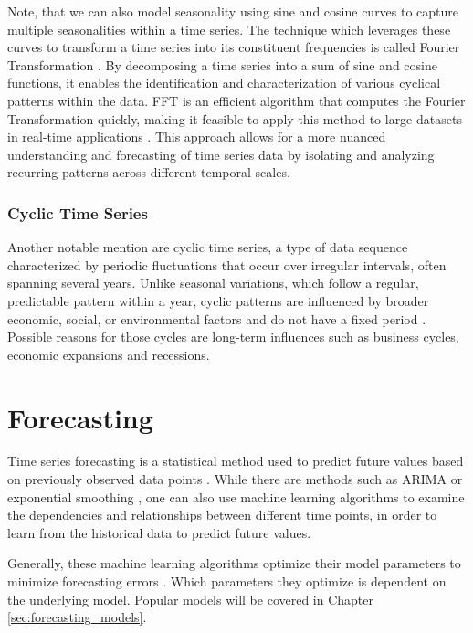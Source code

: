 Note, that we can also model seasonality using sine and cosine curves to capture multiple seasonalities within a time series. The technique which leverages these curves to transform a time series into its constituent frequencies is called Fourier Transformation \parencite[ch. 1]{bloomfield2004fourier}. By decomposing a time series into a sum of sine and cosine functions, it enables the identification and characterization of various cyclical patterns within the data. \ac{FFT} is an efficient algorithm that computes the Fourier Transformation quickly, making it feasible to apply this method to large datasets in real-time applications \parencite[ch. 5]{bloomfield2004fourier}. This approach allows for a more nuanced understanding and forecasting of time series data by isolating and analyzing recurring patterns across different temporal scales.

\subsubsection*{Cyclic Time Series}
Another notable mention are cyclic time series, a type of data sequence characterized by periodic fluctuations that occur over irregular intervals, often spanning several years. Unlike seasonal variations, which follow a regular, predictable pattern within a year, cyclic patterns are influenced by broader economic, social, or environmental factors and do not have a fixed period \parencite[p.4102]{gharehbaghi2017deep}. Possible reasons for those cycles are long-term influences such as business cycles, economic expansions and recessions.

\section{Forecasting}
\label{sec:Forecasting}
Time series forecasting is a statistical method used to predict future values based on previously observed data points \parencite[ch. 5]{box2015time}. While there are methods such as \ac{ARIMA} or exponential smoothing \parencite[ch. 5]{box2015time}, one can also use machine learning algorithms to examine the dependencies and relationships between different time points, in order to learn from the historical data to predict future values. 

Generally, these machine learning algorithms optimize their model parameters to minimize forecasting errors \parencite[ch. 5]{box2015time}. Which parameters they optimize is dependent on the underlying model. Popular models will be covered in Chapter \ref{sec:forecasting_models}. 

